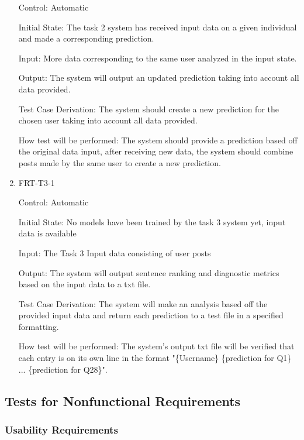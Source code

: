 \documentclass[12pt, titlepage]{article}
\begin{document}
\begin{enumerate}
Control: Automatic

Initial State: The task 2 system has received input data on a given individual and made a corresponding prediction.

Input: More data corresponding to the same user analyzed in the input state.

Output: The system will output an updated prediction taking into account all data provided.

Test Case Derivation: The system should create a new prediction for the chosen user taking into account all data provided.

How test will be performed: The system should provide a prediction based off the original data input, after receiving new data, the system should combine posts made by the same user to create a new prediction. 

\item{FRT-T3-1\\}

Control: Automatic

Initial State: No models have been trained by the task 3 system yet, input data is available

Input: The Task 3 Input data consisting of user posts

Output: The system will output sentence ranking and diagnostic metrics based on the input data to a txt file.

Test Case Derivation: The system will make an analysis based off the provided input data and return each prediction to a test file in a specified formatting.

How test will be performed: The system's output txt file will be verified that each entry is on its own line in the format "\{Username\} \{prediction for Q1\} ... \{prediction for Q28\}".

\end{enumerate}

\subsection{Tests for Nonfunctional Requirements}
\subsubsection{Usability Requirements}
		
\end{document}
